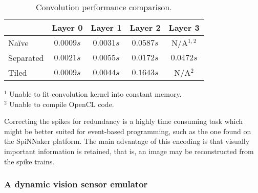 \begin{table}[hbt]
  \begin{center}
    \caption{Convolution performance comparison.}
    \bgroup
    \def\arraystretch{1.4}
    \begin{tabular}{l c c c c}
      &
      \begin{minipage}{2cm}\centering Layer 0\vspace*{0.1cm}\end{minipage} & 
      \begin{minipage}{2cm}\centering
        Layer 1\vspace*{0.1cm}\end{minipage}& 
      \begin{minipage}{2cm}\centering
        Layer 2\vspace*{0.1cm}\end{minipage}& 
      \begin{minipage}{2cm}\centering
        Layer 3\vspace*{0.1cm}\end{minipage}\\
      \hline 
      
      Naïve     & $0.0009 s$ & $0.0031 s$ & $0.0587 s$ & N/A$^{1,2}$ \\ 
      Separated & $0.0021 s$ & $0.0055 s$ & $0.0172 s$ & $0.0472 s$ \\ 
      Tiled     & $0.0009 s$ & $0.0044 s$ & $0.1643 s$ & N/A$^2$\\
    \end{tabular} 
    \egroup
    {
      \footnotesize 
      \begin{center}
        $^1$ Unable to fit convolution kernel into constant memory.\\
        $^2$ Unable to compile OpenCL code.
      \end{center}
    }
  \end{center}
  \vspace*{-5pt}
\end{table}

Correcting the spikes for redundancy is a highly time consuming task which
might be better suited for event-based programming, such as the one found on 
the SpiNNaker platform. The main advantage of this encoding is that visually important information is retained, that is, an image may be reconstructed from the spike trains. 



\subsubsection{A dynamic vision sensor emulator}


